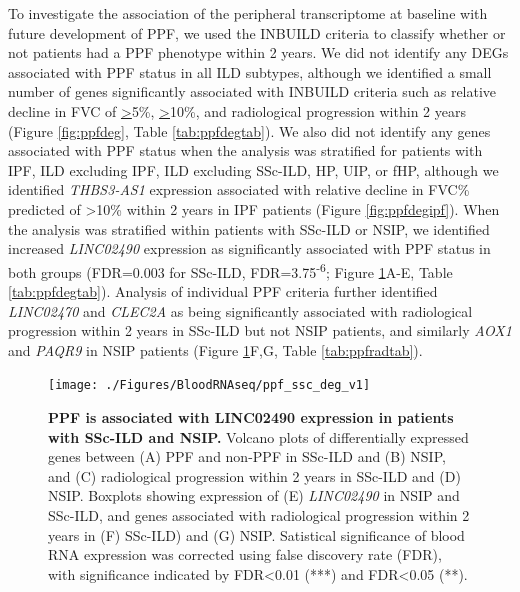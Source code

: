 \documentclass[
]{article}
\begin{document}
To investigate the association of the peripheral transcriptome at baseline with future development of PPF, we used the INBUILD criteria to classify whether or not patients had a PPF phenotype within 2 years. We did not identify any DEGs associated with PPF status in all ILD subtypes, although we identified a small number of genes significantly associated with INBUILD criteria such as relative decline in FVC of \underline{>}5\%, \underline{>}10\%, and radiological progression within 2 years (Figure \ref{fig:ppfdeg}, Table \ref{tab:ppfdegtab}). We also did not identify any genes associated with PPF status when the analysis was stratified for patients with IPF, ILD excluding IPF, ILD excluding SSc-ILD, HP, UIP, or fHP, although we identified \textit{THBS3-AS1} expression associated with relative decline in FVC\% predicted of \textgreater10\% within 2 years in IPF patients (Figure \ref{fig:ppfdegipf}). When the analysis was stratified within patients with SSc-ILD or NSIP, we identified increased \textit{LINC02490} expression as significantly associated with PPF status in both groups (FDR=0.003 for SSc-ILD, FDR=3.75\textsuperscript{-6}; Figure \ref{fig:sscnsipppf}A-E, Table \ref{tab:ppfdegtab}). Analysis of individual PPF criteria further identified \textit{LINC02470} and \textit{CLEC2A} as being significantly associated with radiological progression within 2 years in SSc-ILD but not NSIP patients, and similarly \textit{AOX1} and \textit{PAQR9} in NSIP patients (Figure \ref{fig:sscnsipppf}F,G, Table \ref{tab:ppfradtab}).



\begin{figure}

{\centering \texttt{[image: ./Figures/BloodRNAseq/ppf\_ssc\_deg\_v1]} 

}

\caption[PPF transcriptome in SSc-ILD and NSIP]{\textbf{PPF is associated with LINC02490 expression in patients with SSc-ILD and NSIP.} Volcano plots of differentially expressed genes between (A) PPF and non-PPF in SSc-ILD and (B) NSIP, and (C) radiological progression within 2 years in SSc-ILD and (D) NSIP. Boxplots showing expression of (E) \textit{LINC02490} in NSIP and SSc-ILD, and genes associated with radiological progression within 2 years in (F) SSc-ILD) and (G) NSIP. Satistical significance of blood RNA expression was corrected using false discovery rate (FDR), with significance indicated by FDR\textless0.01 (***) and FDR\textless0.05 (**).}\label{fig:sscnsipppf}
\end{figure}
\end{document}
